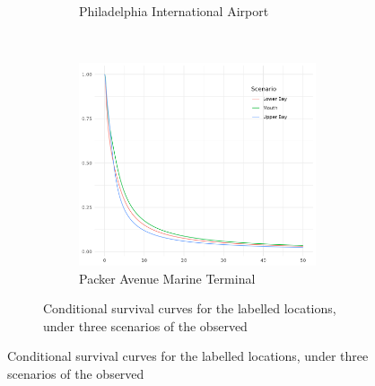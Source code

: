\begin{figure}[ht]
\begin{figure}[htb]
\begin{subfigure}[t]{0.31\textwidth}
        \caption{Philadelphia International Airport\label{fig:condsurv1d:pia}}
    \end{subfigure}%
    ~
    \begin{subfigure}[t]{0.31\textwidth}
        \centering
        \includegraphics[width=\linewidth]{./plots/condsurv/packerave}
        \caption{Packer Avenue Marine Terminal\label{fig:condsurv1d:packerave}}
    \end{subfigure}
    \caption{Conditional survival curves for the labelled locations, under three scenarios of the observed \label{fig:condsurv1d}}
\end{figure}


\end{figure}
